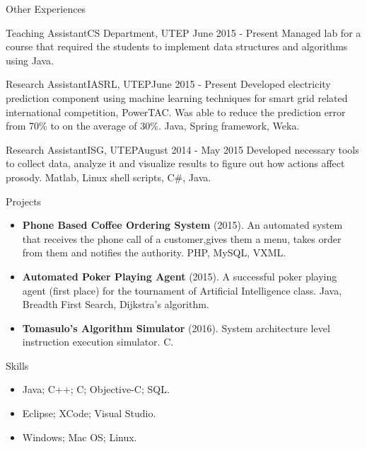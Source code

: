 \documentclass[]{mcdowellcv}
\begin{document}
	\begin{cvsection}{Other Experiences}
		\begin{cvsubsection}{Teaching Assistant}{CS Department, UTEP }{June 2015 - Present}
			Managed lab for a course that required the students to implement data structures and algorithms using Java.
		\end{cvsubsection}
		\begin{cvsubsection}{Research Assistant}{IASRL, UTEP}{June 2015 - Present}
			Developed electricity prediction component using machine learning techniques for smart grid related international competition, PowerTAC. Was able to reduce the prediction error from 70\% to on the average of 30\%. Java, Spring framework, Weka.
		\end{cvsubsection}
		
		\begin{cvsubsection}{Research Assistant}{ISG, UTEP}{August 2014 - May 2015} 
			Developed necessary tools to collect data, analyze it and visualize results to figure out how actions affect prosody. Matlab, Linux shell scripts, C\#, Java.
		\end{cvsubsection}
	\end{cvsection}
	
	
	\begin{cvsection}{Projects}
		\begin{cvsubsection}{}{}{}
			\begin{itemize}
				\item \textbf{Phone Based Coffee Ordering System} (2015). An automated system that receives the phone call of a customer,gives them a menu, takes order from them and notifies the authority.  PHP, MySQL, VXML.
				\item \textbf{Automated Poker Playing Agent} (2015). A successful poker playing agent (first place) for the tournament of Artificial Intelligence class.  Java, Breadth First Search, Dijkstra's algorithm.
				\item \textbf{Tomasulo's Algorithm Simulator} (2016).  System architecture level instruction execution simulator. C.
			\end{itemize}
		\end{cvsubsection}
	\end{cvsection}
	
	
	\begin{cvsection}{Skills}
		\begin{cvsubsection}{}{}{}	
			\begin{itemize}
				\item Java; C++; C; Objective-C; SQL.  
				\item Eclipse; XCode; Visual Studio.
				\item Windows; Mac OS; Linux. 
			\end{itemize}
		\end{cvsubsection}
	\end{cvsection}
	
\end{document}
